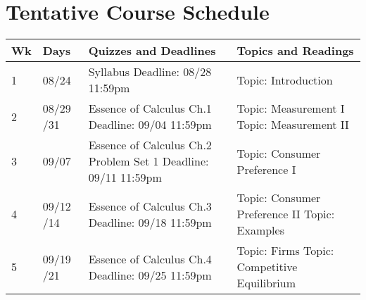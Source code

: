 \documentclass[12pt]{article}
\begin{document}
\newpage

\section*{Tentative Course Schedule}

\newlength\bb
\setlength{}
\newlength\qq
\setlength{}
\newlength\rr
\setlength{}
\newlength\pp
\setlength{}
\begin{tabular}{|p{\bb}|p{\qq}|p{\rr}|p{\pp}|}
    \hline
        Wk
        & Days
        & Quizzes and Deadlines
        & Topics and Readings
    \\
    \hline
    \hline
        1
        &
        08/24
        &
        Syllabus
        \newline
        Deadline: 08/28 11:59pm
        &
        Topic: Introduction
    \\
    \hline
        2
        &
        08/29
        \newline
        08/31
        &
        Essence of Calculus Ch.1
        \newline
        Deadline: 09/04 11:59pm
        &
        Topic: Measurement I
        \newline
        Topic: Measurement II
    \\
    \hline
        3
        &
        09/07
        &
        Essence of Calculus Ch.2
        \newline
        Problem Set 1
        \newline
        Deadline: 09/11 11:59pm
        &
        Topic: Consumer Preference I
    \\
    \hline
        4
        &
        09/12
        \newline
        09/14
        &
        Essence of Calculus Ch.3
        \newline
        Deadline: 09/18 11:59pm
        &
        Topic: Consumer Preference II
        \newline
        Topic: Examples
    \\
    \hline
        5
        &
        09/19
        \newline
        09/21
        &
        Essence of Calculus Ch.4
        \newline
        Deadline: 09/25 11:59pm
        &
        Topic: Firms
        \newline
        Topic: Competitive Equilibrium

\end{tabular}
\end{document}
